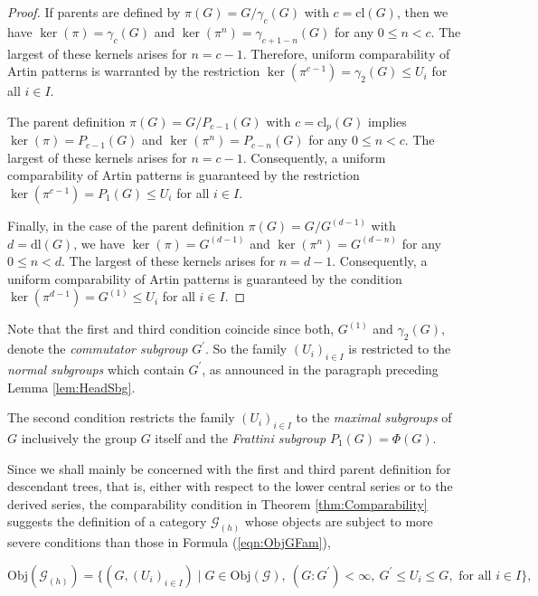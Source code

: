 \documentclass{amsart}
\theoremstyle{definition}
\numberwithin{equation}{section}
\begin{document}
\begin{proof}
If parents are defined by \(\pi(G)=G/\gamma_c(G)\) with \(c=\mathrm{cl}(G)\), then
we have \(\ker(\pi)=\gamma_c(G)\) and \(\ker(\pi^n)=\gamma_{c+1-n}(G)\) for any \(0\le n<c\).
The largest of these kernels arises for \(n=c-1\).
Therefore, uniform comparability of Artin patterns is warranted by the restriction
\(\ker(\pi^{c-1})=\gamma_{2}(G)\le U_i\) for all \(i\in I\).

The parent definition \(\pi(G)=G/P_{c-1}(G)\) with \(c=\mathrm{cl}_p(G)\)
implies \(\ker(\pi)=P_{c-1}(G)\) and \(\ker(\pi^n)=P_{c-n}(G)\) for any \(0\le n<c\).
The largest of these kernels arises for \(n=c-1\).
Consequently, a uniform comparability of Artin patterns is guaranteed by the restriction
\(\ker(\pi^{c-1})=P_{1}(G)\le U_i\) for all \(i\in I\).

Finally, in the case of the parent definition \(\pi(G)=G/G^{(d-1)}\) with \(d=\mathrm{dl}(G)\),
we have \(\ker(\pi)=G^{(d-1)}\) and \(\ker(\pi^n)=G^{(d-n)}\) for any \(0\le n<d\).
The largest of these kernels arises for \(n=d-1\).
Consequently, a uniform comparability of Artin patterns is guaranteed by the condition
\(\ker(\pi^{d-1})=G^{(1)}\le U_i\) for all \(i\in I\).
\end{proof}

Note that the first and third condition coincide
since both, \(G^{(1)}\) and \(\gamma_2(G)\), denote the \textit{commutator subgroup} \(G^\prime\).
So the family \((U_i)_{i\in I}\) is restricted to the \textit{normal subgroups}
which contain \(G^\prime\),
as announced in the paragraph preceding Lemma
\ref{lem:HeadSbg}.

The second condition restricts the family \((U_i)_{i\in I}\)
to the \textit{maximal subgroups} of \(G\)
inclusively the group \(G\) itself and the \textit{Frattini subgroup} \(P_1(G)=\Phi(G)\).



Since we shall mainly be concerned with the first and third parent definition
for descendant trees, that is, either with respect to the lower central series
or to the derived series, the comparability condition in Theorem
\ref{thm:Comparability}
suggests the definition of a category \(\mathcal{G}_{(h)}\)
whose objects are subject to more severe conditions than those in Formula
(\ref{eqn:ObjGFam}),

\begin{equation}
\label{eqn:ObjGHead}
\mathrm{Obj}(\mathcal{G}_{(h)})=\lbrace (G,(U_i)_{i\in I})\mid
G\in\mathrm{Obj}(\mathcal{G}),\ (G:G^\prime)<\infty,\ G^\prime\le U_i\le G, \text{ for all } i\in I\rbrace,
\end{equation}
\end{document}
